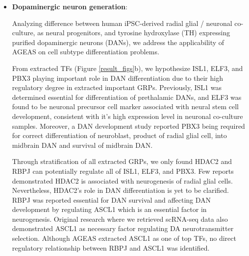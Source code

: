 \documentclass[fleqn,10pt]{wlscirep}
\begin{document}
  \begin{itemize}
      \setlength\itemsep{0em}
      \item {\textbf{Dopaminergic neuron generation}}:

        Analyzing difference between human iPSC-derived radial glial / neuronal co-culture, as neural progenitors,\cite{ASCL1_dopaminergic_neuron_2021} and tyrosine hydroxylase (TH) expressing purified dopaminergic neurons (DANs), we address the applicability of AGEAS on cell subtype differentiation problems.

        From extracted TFs (Figure \ref{result_figs}b), we hypothesize ISL1, ELF3, and PBX3 playing important role in DAN differentiation due to their high regulatory degree in extracted important GRPs.
        Previously, ISL1 was determined essential for differentiation of prethalamic DANs, \cite{isl1_da} and ELF3 was found to be neuronal precursor cell marker associated with neural stem cell development, \cite{ELF3_precursor_marker} consistent with it's high expression level in neuronal co-culture samples.
        Moreover, a DAN development study reported PBX3 being required for correct differentiation of neuroblast, product of radial glial cell, into midbrain DAN and survival of midbrain DAN. \cite{pbx3_dan}

        Through stratification of all extracted GRPs, we only found HDAC2 and RBPJ can potentially regulate all of ISL1, ELF3, and PBX3.
        Few reports demonstrated HDAC2 is associated with neurogenesis of radial glial cells. \cite{hdac2_dan_1, hdac2_dan_2}
        Nevertheless, HDAC2's role in DAN differentiation is yet to be clarified.
        RBPJ was reported essential for DAN survival and affecting DAN development by regulating ASCL1 which is an essential factor in neurogenesis. \cite{rbpj_1, rbpj_2}
        Original research where we retrieved scRNA-seq data also demonstrated ASCL1 as necessary factor regulating DA neurotransmitter selection. \cite{ASCL1_dopaminergic_neuron_2021}
        Although AGEAS extracted ASCL1 as one of top TFs, no direct regulatory relationship between RBPJ and ASCL1 was identified.


\end{itemize}
\end{document}
